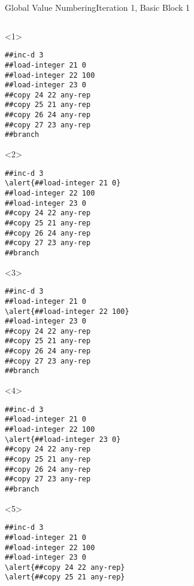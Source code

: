 \documentclass{beamer}
\begin{document}
\begin{frame}[fragile]{Global Value Numbering}{Iteration 1, Basic Block 1}
  \footnotesize
  \begin{columns}[t,onlytextwidth]
    \begin{column}[t]{.5\textwidth}
      \begin{onlyenv}<1>
        \begin{Verbatim}[frame=single,commandchars=\\\{\}]
##inc-d 3
##load-integer 21 0
##load-integer 22 100
##load-integer 23 0
##copy 24 22 any-rep
##copy 25 21 any-rep
##copy 26 24 any-rep
##copy 27 23 any-rep
##branch
        \end{Verbatim}
      \end{onlyenv}
      \begin{onlyenv}<2>
        \begin{Verbatim}[frame=single,commandchars=\\\{\}]
##inc-d 3
\alert{##load-integer 21 0}
##load-integer 22 100
##load-integer 23 0
##copy 24 22 any-rep
##copy 25 21 any-rep
##copy 26 24 any-rep
##copy 27 23 any-rep
##branch
        \end{Verbatim}
      \end{onlyenv}
      \begin{onlyenv}<3>
        \begin{Verbatim}[frame=single,commandchars=\\\{\}]
##inc-d 3
##load-integer 21 0
\alert{##load-integer 22 100}
##load-integer 23 0
##copy 24 22 any-rep
##copy 25 21 any-rep
##copy 26 24 any-rep
##copy 27 23 any-rep
##branch
        \end{Verbatim}
      \end{onlyenv}
      \begin{onlyenv}<4>
        \begin{Verbatim}[frame=single,commandchars=\\\{\}]
##inc-d 3
##load-integer 21 0
##load-integer 22 100
\alert{##load-integer 23 0}
##copy 24 22 any-rep
##copy 25 21 any-rep
##copy 26 24 any-rep
##copy 27 23 any-rep
##branch
        \end{Verbatim}
      \end{onlyenv}
      \begin{onlyenv}<5>
        \begin{Verbatim}[frame=single,commandchars=\\\{\}]
##inc-d 3
##load-integer 21 0
##load-integer 22 100
##load-integer 23 0
\alert{##copy 24 22 any-rep}
\alert{##copy 25 21 any-rep}

\end{Verbatim}
\end{onlyenv}
\end{column}
\end{columns}
\end{frame}
\end{document}
